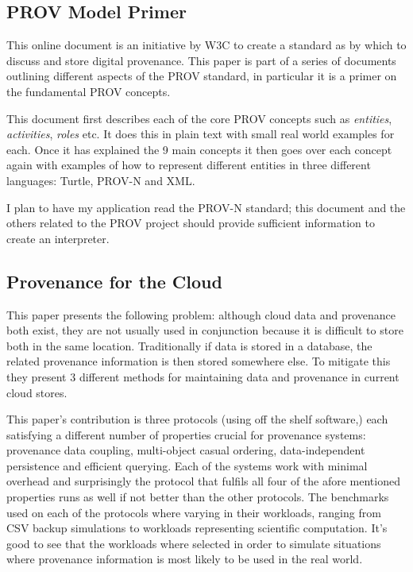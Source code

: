 \subsection{PROV Model Primer\cite{primer2013}}
\label{sub:prov_standard}

This online document is an initiative by W3C to create a standard as by which to discuss and store digital provenance. This paper is part of a series of documents outlining different aspects of the PROV standard, in particular it is a primer on the fundamental PROV concepts.

This document first describes each of the core PROV concepts such as \textit{entities}, \textit{activities}, \textit{roles} etc. It does this in plain text with small real world examples for each. Once it has explained the 9 main concepts it then goes over each concept again with examples of how to represent different entities in three different languages: Turtle, PROV-N and XML.

I plan to have my application read the PROV-N standard; this document and the others related to the PROV project should provide sufficient information to create an interpreter.

\subsection{Provenance for the Cloud \cite{Muniswamy-Reddy2010}}
\label{sub:provenance_for_the_cloud}

This paper presents the following problem: although cloud data and provenance both exist, they are not usually used in conjunction because it is difficult to store both in the same location. Traditionally if data is stored in a database, the related provenance information is then stored somewhere else. To mitigate this they present 3 different methods for maintaining data and provenance in current cloud stores.

This paper's contribution is three protocols (using off the shelf software,) each satisfying a different number of properties crucial for provenance systems: provenance data coupling, multi-object casual ordering, data-independent persistence and efficient querying. Each of the systems work with minimal overhead and surprisingly the protocol that fulfils all four of the afore mentioned properties runs as well if not better than the other protocols. The benchmarks used on each of the protocols where varying in their workloads, ranging from CSV backup simulations to workloads representing scientific computation. It's good to see that the workloads where selected in order to simulate situations where provenance information is most likely to be used in the real world.

